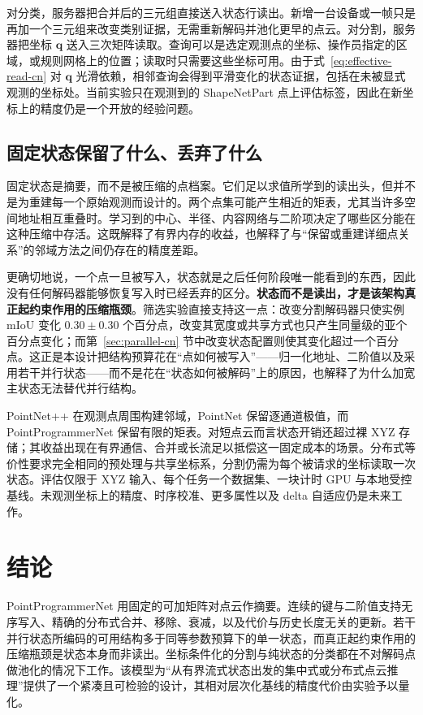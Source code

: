 \documentclass[UTF8,a4paper,11pt,fontset=windows]{ctexart}
\begin{document}
对分类，服务器把合并后的三元组直接送入状态行读出。新增一台设备或一帧只是再加一个三元组来改变类别证据，无需重新解码并池化更早的点云。对分割，服务器把坐标 $\bm q$ 送入三次矩阵读取。查询可以是选定观测点的坐标、操作员指定的区域，或规则网格上的位置；读取时只需要这些坐标可用。由于式~\eqref{eq:effective-read-cn} 对 $\bm q$ 光滑依赖，相邻查询会得到平滑变化的状态证据，包括在未被显式观测的坐标处。当前实验只在观测到的 ShapeNetPart 点上评估标签，因此在新坐标上的精度仍是一个开放的经验问题。

\subsection{固定状态保留了什么、丢弃了什么}
\label{sec:bottleneck-cn}
固定状态是摘要，而不是被压缩的点档案。它们足以求值所学到的读出头，但并不是为重建每一个原始观测而设计的。两个点集可能产生相近的矩表，尤其当许多空间地址相互重叠时。学习到的中心、半径、内容网络与二阶项决定了哪些区分能在这种压缩中存活。这既解释了有界内存的收益，也解释了与“保留或重建详细点关系”的邻域方法之间仍存在的精度差距。

更确切地说，一个点一旦被写入，状态就是之后任何阶段唯一能看到的东西，因此没有任何解码器能够恢复写入时已经丢弃的区分。\textbf{状态而不是读出，才是该架构真正起约束作用的压缩瓶颈}。筛选实验直接支持这一点：改变分割解码器只使实例 mIoU 变化 $0.30\pm0.30$ 个百分点，改变其宽度或共享方式也只产生同量级的亚个百分点变化；而第~\ref{sec:parallel-cn} 节中改变状态配置则使其变化超过一个百分点。这正是本设计把结构预算花在“点如何被写入”——归一化地址、二阶值以及采用若干并行状态——而不是花在“状态如何被解码”上的原因，也解释了为什么加宽主状态无法替代并行结构。

PointNet++ 在观测点周围构建邻域，PointNet 保留逐通道极值，而 PointProgrammerNet 保留有限的矩表。对短点云而言状态开销还超过裸 XYZ 存储；其收益出现在有界通信、合并或长流足以抵偿这一固定成本的场景。分布式等价性要求完全相同的预处理与共享坐标系，分割仍需为每个被请求的坐标读取一次状态。评估仅限于 XYZ 输入、每个任务一个数据集、一块计时 GPU 与本地受控基线。未观测坐标上的精度、时序校准、更多属性以及 delta 自适应仍是未来工作。

\section{结论}
PointProgrammerNet 用固定的可加矩阵对点云作摘要。连续的键与二阶值支持无序写入、精确的分布式合并、移除、衰减，以及代价与历史长度无关的更新。若干并行状态所编码的可用结构多于同等参数预算下的单一状态，而真正起约束作用的压缩瓶颈是状态本身而非读出。坐标条件化的分割与纯状态的分类都在不对解码点做池化的情况下工作。该模型为“从有界流式状态出发的集中式或分布式点云推理”提供了一个紧凑且可检验的设计，其相对层次化基线的精度代价由实验予以量化。
\end{document}
